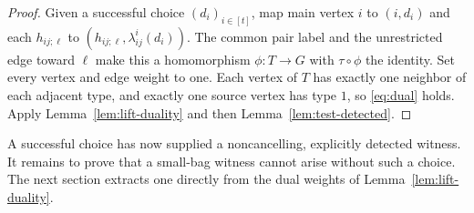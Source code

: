 \begin{proof}
Given a successful choice \((d_i)_{i\in[t]}\), map main vertex \(i\)
to \((i,d_i)\) and each \(h_{ij;\ell}\) to
\((h_{ij;\ell},\lambda_{ij}^i(d_i))\).
The common pair label and the unrestricted edge toward \(\ell\)
make this a homomorphism \(\phi:T\to G\) with
\(\tau\circ\phi\) the identity. Set every vertex and edge weight to
one. Each vertex of \(T\) has exactly one neighbor of each adjacent
type, and exactly one source vertex has type \(1\), so
\eqref{eq:dual} holds. Apply Lemma~\ref{lem:lift-duality} and then
Lemma~\ref{lem:test-detected}.
\end{proof}


A successful choice has now supplied a noncancelling, explicitly detected
witness. It remains to prove that a small-bag witness cannot arise without
such a choice. The next section extracts one directly from the dual
weights of Lemma~\ref{lem:lift-duality}.
